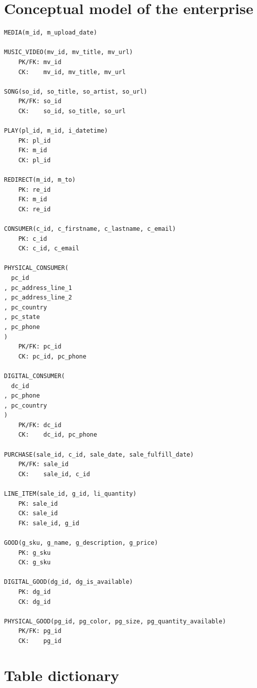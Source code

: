 \documentclass[11pt, a4paper]{report}
\begin{document}
\clearpage
\section{Conceptual model of the enterprise}

\begin{verbatim}
MEDIA(m_id, m_upload_date)

MUSIC_VIDEO(mv_id, mv_title, mv_url)
    PK/FK: mv_id
    CK:    mv_id, mv_title, mv_url

SONG(so_id, so_title, so_artist, so_url)
    PK/FK: so_id
    CK:    so_id, so_title, so_url

PLAY(pl_id, m_id, i_datetime)
    PK: pl_id
    FK: m_id
    CK: pl_id

REDIRECT(m_id, m_to)
    PK: re_id
    FK: m_id
    CK: re_id

CONSUMER(c_id, c_firstname, c_lastname, c_email)
    PK: c_id
    CK: c_id, c_email

PHYSICAL_CONSUMER(
  pc_id
, pc_address_line_1
, pc_address_line_2
, pc_country
, pc_state
, pc_phone
)
    PK/FK: pc_id
    CK: pc_id, pc_phone

DIGITAL_CONSUMER(
  dc_id
, pc_phone
, pc_country
)
    PK/FK: dc_id
    CK:    dc_id, pc_phone

PURCHASE(sale_id, c_id, sale_date, sale_fulfill_date)
    PK/FK: sale_id
    CK:    sale_id, c_id

LINE_ITEM(sale_id, g_id, li_quantity)
    PK: sale_id
    CK: sale_id
    FK: sale_id, g_id

GOOD(g_sku, g_name, g_description, g_price)
    PK: g_sku
    CK: g_sku

DIGITAL_GOOD(dg_id, dg_is_available)
    PK: dg_id
    CK: dg_id

PHYSICAL_GOOD(pg_id, pg_color, pg_size, pg_quantity_available)
    PK/FK: pg_id
    CK:    pg_id
\end{verbatim}

\clearpage
\section{Table dictionary}
\end{document}
